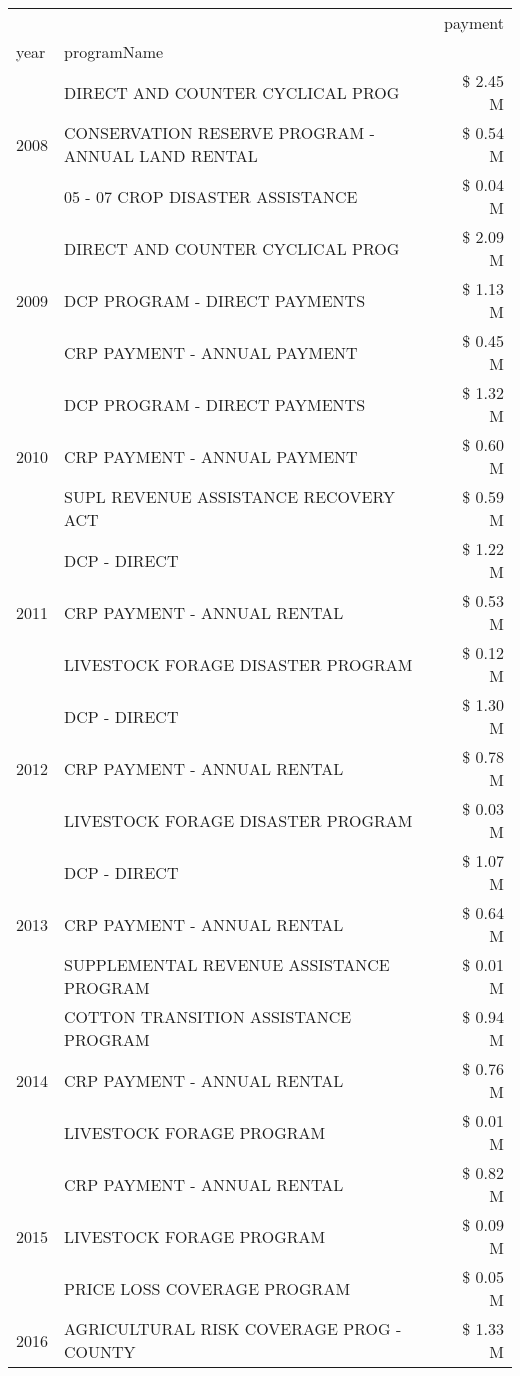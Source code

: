 \begin{tabular}{llr}
\toprule
 &  & payment \\
year & programName &  \\
\midrule
\multirow[t]{3}{*}{2008} & DIRECT AND COUNTER CYCLICAL PROG & \$ 2.45 M \\
 & CONSERVATION RESERVE PROGRAM - ANNUAL LAND RENTAL & \$ 0.54 M \\
 & 05 - 07 CROP DISASTER ASSISTANCE & \$ 0.04 M \\
\cline{1-3}
\multirow[t]{3}{*}{2009} & DIRECT AND COUNTER CYCLICAL PROG & \$ 2.09 M \\
 & DCP PROGRAM - DIRECT PAYMENTS & \$ 1.13 M \\
 & CRP PAYMENT - ANNUAL PAYMENT & \$ 0.45 M \\
\cline{1-3}
\multirow[t]{3}{*}{2010} & DCP PROGRAM - DIRECT PAYMENTS & \$ 1.32 M \\
 & CRP PAYMENT - ANNUAL PAYMENT & \$ 0.60 M \\
 & SUPL REVENUE ASSISTANCE RECOVERY ACT & \$ 0.59 M \\
\cline{1-3}
\multirow[t]{3}{*}{2011} & DCP - DIRECT & \$ 1.22 M \\
 & CRP PAYMENT - ANNUAL RENTAL & \$ 0.53 M \\
 & LIVESTOCK FORAGE DISASTER PROGRAM & \$ 0.12 M \\
\cline{1-3}
\multirow[t]{3}{*}{2012} & DCP - DIRECT & \$ 1.30 M \\
 & CRP PAYMENT - ANNUAL RENTAL & \$ 0.78 M \\
 & LIVESTOCK FORAGE DISASTER PROGRAM & \$ 0.03 M \\
\cline{1-3}
\multirow[t]{3}{*}{2013} & DCP - DIRECT & \$ 1.07 M \\
 & CRP PAYMENT - ANNUAL RENTAL & \$ 0.64 M \\
 & SUPPLEMENTAL REVENUE ASSISTANCE PROGRAM & \$ 0.01 M \\
\cline{1-3}
\multirow[t]{3}{*}{2014} & COTTON TRANSITION ASSISTANCE PROGRAM & \$ 0.94 M \\
 & CRP PAYMENT - ANNUAL RENTAL & \$ 0.76 M \\
 & LIVESTOCK FORAGE PROGRAM & \$ 0.01 M \\
\cline{1-3}
\multirow[t]{3}{*}{2015} & CRP PAYMENT - ANNUAL RENTAL & \$ 0.82 M \\
 & LIVESTOCK FORAGE PROGRAM & \$ 0.09 M \\
 & PRICE LOSS COVERAGE PROGRAM & \$ 0.05 M \\
\cline{1-3}
\multirow[t]{3}{*}{2016} & AGRICULTURAL RISK COVERAGE PROG - COUNTY & \$ 1.33 M \\

\end{tabular}
